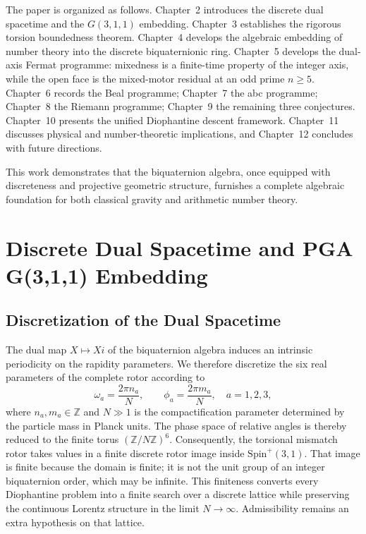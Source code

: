 \documentclass[a4paper]{article}
\theoremstyle{definition}
\theoremstyle{remark}
\begin{document}
The paper is organized as follows. Chapter~2 introduces the discrete dual spacetime and the \(G(3,1,1)\) embedding. Chapter~3 establishes the rigorous torsion boundedness theorem. Chapter~4 develops the algebraic embedding of number theory into the discrete biquaternionic ring. Chapter~5 develops the dual-axis Fermat programme: mixedness is a finite-time property of the integer axis, while the open face is the mixed-motor residual at an odd prime \(n\ge 5\). Chapter~6 records the Beal programme; Chapter~7 the abc programme; Chapter~8 the Riemann programme; Chapter~9 the remaining three conjectures. Chapter~10 presents the unified Diophantine descent framework. Chapter~11 discusses physical and number-theoretic implications, and Chapter~12 concludes with future directions.

This work demonstrates that the biquaternion algebra, once equipped with discreteness and projective geometric structure, furnishes a complete algebraic foundation for both classical gravity and arithmetic number theory.

\section{Discrete Dual Spacetime and PGA G(3,1,1) Embedding}

\subsection{Discretization of the Dual Spacetime}

The dual map \( X \mapsto Xi \) of the biquaternion algebra induces an intrinsic periodicity on the rapidity parameters. We therefore discretize the six real parameters of the complete rotor according to
\[
\omega_a = \frac{2\pi n_a}{N}, \qquad \phi_a = \frac{2\pi m_a}{N}, \quad a=1,2,3,
\]
where \( n_a, m_a \in \mathbb{Z} \) and \( N \gg 1 \) is the compactification parameter determined by the particle mass in Planck units. The phase space of relative angles is thereby reduced to the finite torus \( (\mathbb{Z}/N\mathbb{Z})^6 \). Consequently, the torsional mismatch rotor takes values in a finite discrete rotor image inside \( \mathrm{Spin}^+(3,1) \). That image is finite because the domain is finite; it is not the unit group of an integer biquaternion order, which may be infinite. This finiteness converts every Diophantine problem into a finite search over a discrete lattice while preserving the continuous Lorentz structure in the limit \( N \to \infty \). Admissibility remains an extra hypothesis on that lattice.
\end{document}
